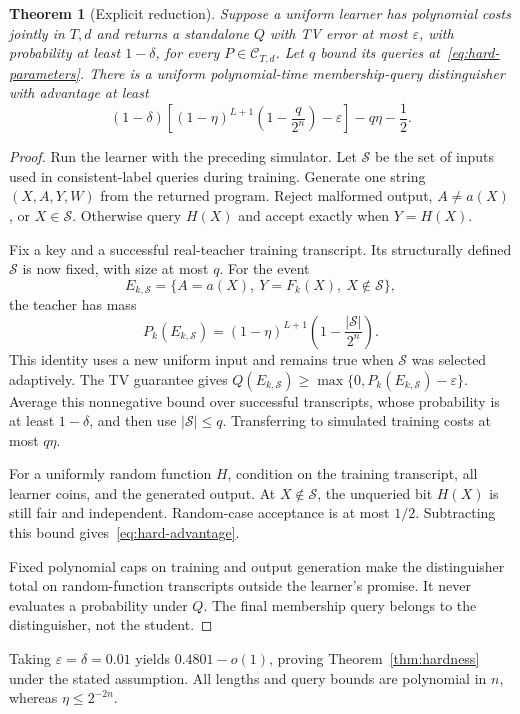 \documentclass[11pt]{article}
\newtheorem{theorem}{Theorem}
\theoremstyle{definition}
\theoremstyle{remark}
\begin{document}
\begin{theorem}[Explicit reduction]\label{thm:reduction}
Suppose a uniform learner has polynomial costs jointly in $T,d$ and returns a standalone $Q$ with TV error at most $\varepsilon$, with probability at least $1-\delta$, for every $P\in\mathcal C_{T,d}$. Let $q$ bound its queries at~\eqref{eq:hard-parameters}. There is a uniform polynomial-time membership-query distinguisher with advantage at least
\begin{equation}\label{eq:hard-advantage}
(1-\delta)\left[(1-\eta)^{L+1}
\left(1-\frac q{2^n}\right)-\varepsilon\right]
-q\eta-\frac12.
\end{equation}
\end{theorem}
\begin{proof}
Run the learner with the preceding simulator. Let $\mathcal S$ be the set of inputs used in consistent-label queries during training. Generate one string $(X,A,Y,W)$ from the returned program. Reject malformed output, $A\ne a(X)$, or $X\in\mathcal S$. Otherwise query $H(X)$ and accept exactly when $Y=H(X)$.

Fix a key and a successful real-teacher training transcript. Its structurally defined $\mathcal S$ is now fixed, with size at most $q$. For the event
\[
E_{k,\mathcal S}=\{A=a(X),\ Y=F_k(X),\ X\notin\mathcal S\},
\]
the teacher has mass
\[
P_k(E_{k,\mathcal S})
=(1-\eta)^{L+1}\left(1-\frac{|\mathcal S|}{2^n}\right).
\]
This identity uses a new uniform input and remains true when $\mathcal S$ was selected adaptively. The TV guarantee gives $Q(E_{k,\mathcal S})\ge\max\{0,P_k(E_{k,\mathcal S})-\varepsilon\}$. Average this nonnegative bound over successful transcripts, whose probability is at least $1-\delta$, and then use $|\mathcal S|\le q$. Transferring to simulated training costs at most $q\eta$.

For a uniformly random function $H$, condition on the training transcript, all learner coins, and the generated output. At $X\notin\mathcal S$, the unqueried bit $H(X)$ is still fair and independent. Random-case acceptance is at most $1/2$. Subtracting this bound gives~\eqref{eq:hard-advantage}.

Fixed polynomial caps on training and output generation make the distinguisher total on random-function transcripts outside the learner's promise. It never evaluates a probability under $Q$. The final membership query belongs to the distinguisher, not the student.
\end{proof}

Taking $\varepsilon=\delta=0.01$ yields $0.4801-o(1)$, proving Theorem~\ref{thm:hardness} under the stated assumption. All lengths and query bounds are polynomial in $n$, whereas $\eta\le2^{-2n}$.
\end{document}
